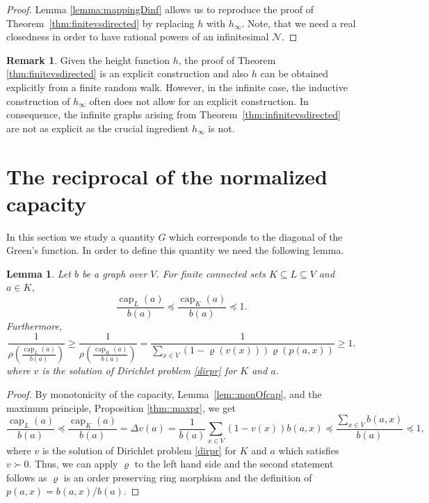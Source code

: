 \documentclass[a4paper,oneside, 12pt]{amsart}
\numberwithin{theorem}{section}
\newtheorem{lemma}[theorem]{Lemma}
\theoremstyle{definition}
\newtheorem{remark}[theorem]{Remark}
\renewcommand{\c}{\operatorname{cap}}
\newcommand{\map}{\varrho}
\begin{document}
{\begin{proof}
 Lemma \ref{lemma:mappingDinf} allows us to reproduce the proof of Theorem~\ref{thm:finitevsdirected} by replacing $ h $ with $h_\infty$. Note, that we need a real closedness in order to have rational  powers of an infinitesimal $\mathcal N$.
\end{proof}


\begin{remark}
	Given the height function $ h $, 
the proof of Theorem \ref{thm:finitevsdirected} is an explicit construction and also $ h $ can be obtained explicitly from a finite random walk. However, in the infinite case, the inductive construction of $ h_{\infty}  $ often does not allow for an explicit construction. In consequence, the infinite graphs arising from 
Theorem~\ref{thm:infinitevsdirected} are not as explicit as the crucial ingredient $ h_{\infty} $ is not.
\end{remark}


\section{The  reciprocal of the normalized capacity}\label{sec:G}

In this section we study a quantity $ G  $ which corresponds to the diagonal of the Green's function.  In order to define this quantity we need the following lemma.


\begin{lemma}\label{cor::GassolOfDP} Let $b$ be a  graph over $V$. For  finite connected sets $K\subseteq L\subseteq V$ and  $a\in K$,
	\begin{equation*}
	\dfrac{\c_L(a)}{b(a)}\preceq	\dfrac{\c_K(a)}{b(a)}\preceq 1.
	\end{equation*}
Furthermore,
	\begin{equation*}
	\dfrac{1}{\displaystyle\rho\left(\frac{\c_L(a)}{b(a)}\right)}\ge 	\dfrac{1}{\displaystyle\rho\left(\frac{\c_K(a)}{b(a)}\right)}=\dfrac1{\sum_{x\in V}{(1-\map(v(x)))\map(p(a,x))}}\ge 1.
	\end{equation*}
	where $v$ is the solution of Dirichlet problem \eqref{dirpr} for $ K $ and $ a $.
\end{lemma}
\begin{proof}
By monotonicity of the capacity, Lemma~\ref{lem::monOfcap}, and the  maximum principle, Proposition \ref{thm::maxpr}, we get
	$$
	\dfrac{\c_L(a)}{b(a)}\preceq \dfrac{\c_K(a)}{b(a)}=\Delta v(a)=\dfrac{1}{b(a)}\sum_{x\in V} {(1-v(x))}b(a,x)\preceq \dfrac{\sum_{x\in V} b(a,x)}{b(a)}\preceq 1,
	$$
	where $v$ is the solution of Dirichlet problem \eqref{dirpr}  for $ K $ and $ a $ which satisfies $ v\succ 0 $. Thus, we can apply $ \map $ to the left hand side and the second statement follows as $ \map $ is an order preserving ring morphism and the definition of $p(a,x)=b(a,x)/b(a)  $.
\end{proof}


}
\end{document}
